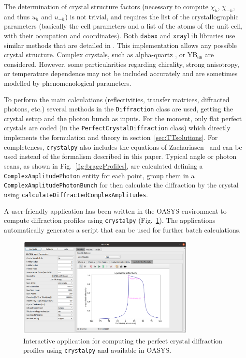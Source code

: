 \documentclass{iucr}
\newcommand{\todo}[1]{{\color{red}[TODO: "#1'']}}
\begin{document}
The determination of crystal structure factors (necessary to compute $\chi_h$, $\chi_{-h}$, and thus $u_h$ and $u_{-h}$) is not trivial, and requires the list of the crystallographic parameters (basically the cell parameters and a list of the atoms of the unit cell, with their occupation and coordinates). Both {\tt dabax} and {\tt xraylib} libraries use similar methods that are detailed in \cite{Yu2022}. This implementation allows any possible crystal structure. Complex crystals, such as alpha-quartz \cite{Sutter2022,Sutter2023}, or YB$_\text{66}$ \cite{Yu2022} are considered. However, some particularities regarding chirality, strong anisotropy, or temperature dependence may not be included accurately and are sometimes modelled by phenomenological parameters.

To perform the main calculations (reflectivities, transfer matrices, diffracted photons, etc.) several methods in the {\tt Diffraction} class are used, getting the crystal setup and the photon bunch as inputs. For the moment, only flat perfect crystals are coded (in the {\tt PerfectCrystalDiffraction} class) which directly implements the formulation and theory in section~\ref{sec:TTsolutions}. For completeness, {\tt crystalpy} also includes the equations of Zachariasen~\cite{ZachariasenBook} and can be used instead of the formalism described in this paper.
Typical angle or photon scans, as shown in Fig.~\ref{fig:braggProfiles}, are calculated defining a {\tt ComplexAmplitudePhoton} entity for each point, group them in a {\tt ComplexAmplitudePhotonBunch} for then calculate the diffraction by the crystal using {\tt calculateDiffractedComplexAmplitudes}.

A user-friendly application has been written in the OASYS environment to compute diffraction profiles using {\tt crystalpy} (Fig.~\ref{fig:xcrystal}). The applications automatically generates a script that can be used for further batch calculations. 

\begin{figure}
    \centering
    \includegraphics[width=0.8\textwidth]{figures/xcrystal.png}
    \caption{Interactive application for computing the perfect crystal diffraction profiles using {\tt crystalpy} and available in OASYS.  }
    \label{fig:xcrystal}
\end{figure}
\end{document}
